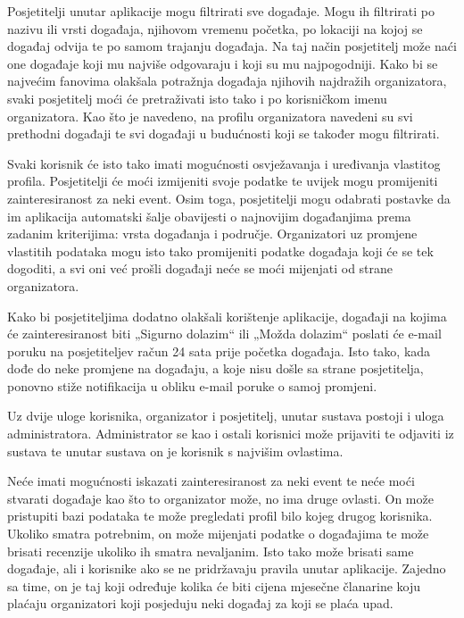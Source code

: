 		Posjetitelji unutar aplikacije mogu filtrirati sve događaje. Mogu ih filtrirati po nazivu ili vrsti događaja, njihovom vremenu početka, po lokaciji na kojoj se događaj odvija te po samom trajanju događaja. Na taj način posjetitelj može naći one događaje koji mu najviše odgovaraju i koji su mu najpogodniji. Kako bi se najvećim fanovima olakšala potražnja događaja njihovih najdražih organizatora, svaki posjetitelj moći će pretraživati isto tako i po korisničkom imenu organizatora. Kao što je navedeno, na profilu organizatora navedeni su svi prethodni događaji te svi događaji u budućnosti koji se također mogu filtrirati.
		
		Svaki korisnik će isto tako imati mogućnosti osvježavanja i uređivanja vlastitog profila. Posjetitelji će moći izmijeniti svoje podatke te uvijek mogu promijeniti zainteresiranost za neki event. Osim toga, posjetitelji mogu odabrati postavke da im aplikacija automatski šalje obavijesti o najnovijim događanjima prema zadanim kriterijima: vrsta događanja i područje. Organizatori uz promjene vlastitih podataka mogu isto tako promijeniti podatke događaja koji će se tek dogoditi, a svi oni već prošli događaji neće se moći mijenjati od strane organizatora. 
		
		Kako bi posjetiteljima dodatno olakšali korištenje aplikacije, događaji na kojima će zainteresiranost biti „Sigurno dolazim“ ili „Možda dolazim“ poslati će e-mail poruku na posjetiteljev račun 24 sata prije početka događaja. Isto tako, kada dođe do neke promjene na događaju, a koje nisu došle sa strane posjetitelja, ponovno stiže notifikacija u obliku e-mail poruke o samoj promjeni.
		
		Uz dvije uloge korisnika, organizator i posjetitelj, unutar sustava postoji i uloga administratora. Administrator se kao i ostali korisnici može prijaviti te odjaviti iz sustava te unutar sustava on je korisnik s najvišim ovlastima. 
		
		Neće imati mogućnosti iskazati zainteresiranost za neki event te neće moći stvarati događaje kao što to organizator može, no ima druge ovlasti. On može pristupiti bazi podataka te može pregledati profil bilo kojeg drugog korisnika. Ukoliko smatra potrebnim, on može mijenjati podatke o događajima te može brisati recenzije ukoliko ih smatra nevaljanim. Isto tako može brisati same događaje, ali i korisnike ako se ne pridržavaju pravila unutar aplikacije. Zajedno sa time, on je taj koji određuje kolika će biti cijena mjesečne članarine koju plaćaju organizatori koji posjeduju neki događaj za koji se plaća upad.
		

